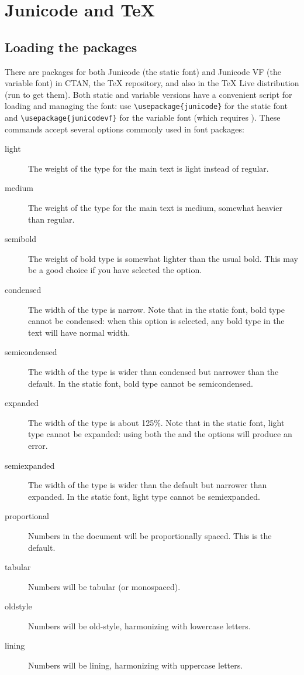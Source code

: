 \chapter{Junicode and {\TeX}}\hypertarget{JunicodeAndTeX}{}

\section{Loading the packages}

There are packages for both Junicode (the static font) and Junicode VF (the variable font) 
in CTAN, the {\TeX} repository, and also
in the {\TeX} Live distribution (run  to get them). Both static and variable versions
have a convenient script for loading and managing the font: use
{\color{BrickRed}\verb|\usepackage{junicode}|} for the static font and
{\color{BrickRed}\verb|\usepackage{junicodevf}|} for the variable font (which requires \ltech).
These commands accept several options commonly used in font packages:

\begin{description}
    \item[light] The weight of the type for the main text is light instead of regular.
    \item[medium] The weight of the type for the main text is medium, somewhat heavier than regular.
    \item[semibold] The weight of bold type is somewhat lighter than the usual bold. This may be a
    good choice if you have selected the  option.
    \item[condensed] The width of the type is narrow. Note that in the static font,
    bold type cannot be condensed: when
    this option is selected, any bold type in the text will have normal width.
    \item[semicondensed] The width of the type is wider than condensed but narrower than the default.
    In the static font, bold type cannot be semicondensed.
    \item[expanded] The width of the type is about 125\%. Note that in the static font, light type
    cannot be expanded: using both the  and the  options will produce
    an error.
    \item[semiexpanded] The width of the type is wider than the default but narrower than expanded.
    In the static font, light type cannot be semiexpanded.
    \item[proportional] Numbers in the document will be proportionally spaced. This is the default.
    \item[tabular] Numbers will be tabular (or monospaced).
    \item[oldstyle] Numbers will be old-style, harmonizing with lowercase letters.
    \item[lining] Numbers will be lining, harmonizing with uppercase letters.
\end{description}

